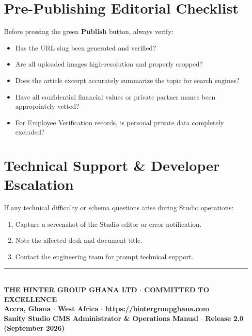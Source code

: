 \documentclass[11pt,a4paper,oneside]{book}
\begin{document}
\section{Pre-Publishing Editorial Checklist}
Before pressing the green \textbf{Publish} button, always verify:
\begin{itemize}[label=$\square$]
  \item Has the URL slug been generated and verified?
  \item Are all uploaded images high-resolution and properly cropped?
  \item Does the article excerpt accurately summarize the topic for search engines?
  \item Have all confidential financial values or private partner names been appropriately vetted?
  \item For Employee Verification records, is personal private data completely excluded?
\end{itemize}

\section{Technical Support \& Developer Escalation}
If any technical difficulty or schema questions arise during Studio operations:
\begin{enumerate}
  \item Capture a screenshot of the Studio editor or error notification.
  \item Note the affected desk and document title.
  \item Contact the engineering team for prompt technical support.
\end{enumerate}

\vfill

\begin{center}
  {\color{HGGGold}\rule{0.6\textwidth}{1.2pt}}\\[0.3cm]
  \small\bfseries\color{HGGNavy}THE HINTER GROUP GHANA LTD $\cdot$ COMMITTED TO EXCELLENCE\\[0.1cm]
  \footnotesize\color{HGGMutedText}Accra, Ghana $\cdot$ West Africa $\cdot$ \url{https://hintergroupghana.com}\\[0.3cm]
  \scriptsize\color{HGGMutedText}Sanity Studio CMS Administrator \& Operations Manual $\cdot$ Release 2.0 (September 2026)
\end{center}
\end{document}
